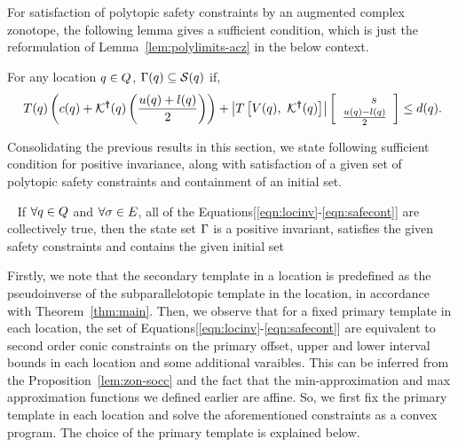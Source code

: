 %
For satisfaction of polytopic safety constraints by an augmented
complex zonotope, the following lemma gives a sufficient condition,
which is just the reformulation of Lemma~\ref{lem:polylimits-acz} in
the below context.
%
\begin{lemma}
For any location $q\in Q$,
  $\Gamma(q)\subseteq \mathcal{S}(q)$ if,
\begin{align}~\label{eqn:safecont}
T(q)\left(c(q)+\mathcal{K}^{\bm{\dagger}}(q)\left(\frac{u(q)+l(q)}{2}\right)\right)+\left|T\left[V(q),~\mathcal{K}^{\bm{\dagger}}(q)\right]\right|\left[\begin{array}{c}{\hspace{1.5em}s}\\{\frac{u(q)-l(q)}{2}} \end{array}\right]\leq d(q).
\end{align}
\end{lemma}
%
Consolidating the previous results in this section, we state following
sufficient condition for positive invariance, along with satisfaction
of a given set of polytopic safety constraints and containment of an initial set.
%
\begin{theorem}~\label{thm:main} If
  $\forall q\in Q$ and $\forall \sigma\in E$, all of
  the Equations[\ref{eqn:locinv}-\ref{eqn:safecont}] are collectively
  true, then the state set $\Gamma$ is a positive invariant,
  satisfies the given safety constraints and contains the given
  initial set
\end{theorem}

  Firstly, we note that the secondary
template in a location is predefined as the pseudoinverse of the
subparallelotopic template in the location, in accordance with
Theorem~\ref{thm:main}.  Then, we observe that for a fixed primary
template in each location, the set of
Equations[\ref{eqn:locinv}-\ref{eqn:safecont}] are equivalent to
second order conic constraints on the primary offset, upper and lower
interval bounds in each location and some additional varaibles.  This
can be inferred from the Proposition~\ref{lem:zon-socc} and the fact
that the min-approximation and max approximation functions we defined
earlier are affine. So, we first fix the primary template in each
location and solve the aforementioned constraints as a convex program.
The choice of the primary template is explained below.

